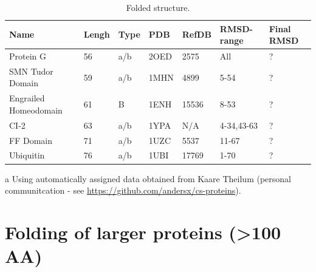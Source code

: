 \begin{table}[h]
    \caption{Folded structure.}
    \begin{center}
    \begin{threeparttable}
    \begin{tabular}{l l l l l  l l}
Name                & Lengh    & Type & PDB     & RefDB     & RMSD-range    & Final RMSD  \\\hline
Protein G           & 56       & a/b & 2OED    & 2575      & All           & ?           \\
SMN Tudor Domain    & 59       & a/b & 1MHN    & 4899      & 5-54          & ?           \\
Engrailed Homeodomain & 61     & B   & 1ENH    & 15536     & 8-53          & ?           \\
CI-2                & 63       & a/b & 1YPA    & N/A\tnote{a}& 4-34,43-63  & ?           \\
FF Domain           & 71       & a/b & 1UZC    & 5537      & 11-67         & ?           \\
Ubiquitin           & 76       & a/b & 1UBI    & 17769     & 1-70          & ?
    \end{tabular}
    \begin{tablenotes}
    \item[a] Using automatically assigned data obtained from Kaare Theilum (personal communitcation - see \url{https://github.com/andersx/cs-proteins}).
    \end{tablenotes}
    \end{threeparttable}
    \end{center}
    \label{tab:folding_small}
\end{table}

\section{Folding of larger proteins (\textgreater 100 AA)}

